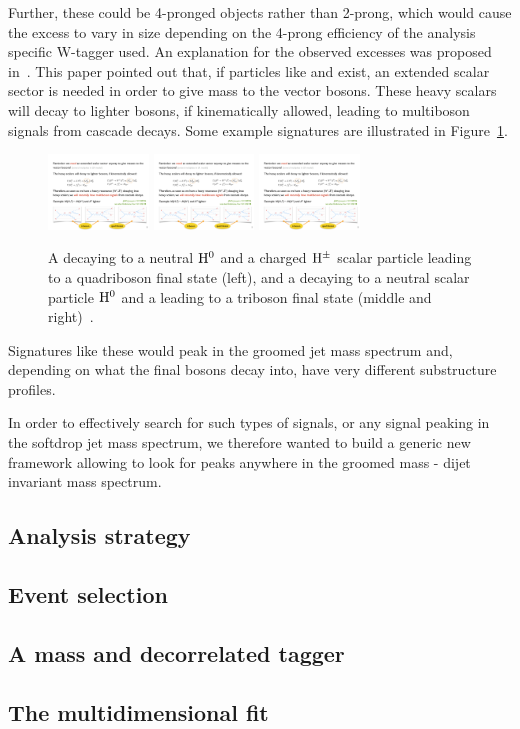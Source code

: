 Further, these could be 4-pronged objects rather than 2-prong, which would cause the excess to vary in size depending on the 4-prong efficiency of the analysis specific W-tagger used.\newline
An explanation for the observed excesses was proposed in~\cite{Aguilar-Saavedra:2018xpl}. This paper pointed out that, if particles like \PWpr and \PZpr exist, an extended scalar sector is needed in order to give mass to the
vector bosons. These heavy scalars will decay to lighter bosons, if kinematically allowed, leading to multiboson signals from cascade decays. Some example signatures are illustrated in Figure~\ref{fig:searchIII:tribosons}.
\begin{figure}[ht] 
    \centering
    \includegraphics[height=2cm]{figures/analysis/search3/misc/quadri.pdf}
    \includegraphics[height=2cm]{figures/analysis/search3/misc/tri1.pdf}
    \includegraphics[height=2cm]{figures/analysis/search3/misc/tri2.pdf}
    \caption{A \PWpr decaying to a neutral $\rm{H}^0$ and a charged $\rm{H}^{\pm}$ scalar particle leading to a quadriboson final state (left), and a \PWpr decaying to a neutral scalar particle $\rm{H}^0$ and a \PW leading to a triboson final state (middle and right)~\cite{Aguilar-Saavedra:2018xpl}.}
    \label{fig:searchIII:tribosons}
\end{figure}
Signatures like these would peak in the groomed jet mass spectrum and, depending on what the final bosons decay into, have very different substructure profiles.\par
In order to effectively search for such types of signals, or any signal peaking in the softdrop jet mass spectrum, we therefore wanted to build a generic new framework allowing to look for peaks anywhere in the groomed mass - dijet invariant mass spectrum.
\subsection{Analysis strategy}
\subsection{Event selection}
\subsection{A mass and \PT decorrelated tagger}
\label{sec:searchIII:ddt}
\subsection{The multidimensional fit}